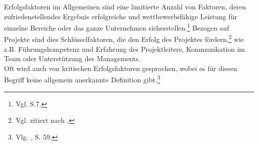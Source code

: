 Erfolgsfaktoren im Allgemeinen sind eine limitierte Anzahl von Faktoren, deren zufriedenstellendes Ergebnis erfolgreiche und 
wettbewerbsfähige Leistung für einzelne Bereiche oder das ganze Unternehmen sicherstellen.\footnote{Vgl. \cite{Bullen.1981} S.7.}
Bezogen auf Projekte sind dies Schlüsselfaktoren, die den Erfolg des Projektes fördern,\footnote{Vgl. \cite{Buschermohle.2010} zitiert nach \cite{Basten.2012}.} wie
z.B. Führungskompetenz und Erfahrung des Projektleiters, Kommunikation im Team oder Unterstützung des Managements.\\
Oft wird auch von kritischen Erfolgsfaktoren gesprochen, wobei es für diesen Begriff keine allgemein anerkannte Definition gibt.\footnote{Vlg. \cite{Basten.2012}, S. 59.}